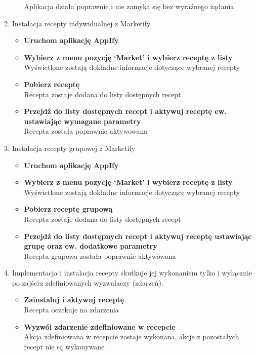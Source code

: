 \documentclass[11pt,a4paper,polish,thesis]{dcsbook}
\begin{document}
\begin{enumerate}
\begin{itemize}
Aplikacja działa poprawnie i nie zamyka się bez wyraźnego żądania
\end{itemize}
\item
Instalacja recepty indywidualnej z Marketify
\begin{itemize}
\item \textbf{Uruchom aplikację AppIfy}\\
\item \textbf{Wybierz z menu pozycję ‘Market’ i wybierz receptę z listy}\\
Wyświetlone zostają dokładne informacje dotyczące wybranej recepty
\item \textbf{Pobierz receptę}\\
Recepta zostaje dodana do listy dostępnych recept
\item \textbf{Przejdź do listy dostępnych recept i aktywuj receptę ew. ustawiając wymagane parametry}\\
Recepta została poprawnie aktywowana
\end{itemize}
\item
Instalacja recepty grupowej z Marketify
\begin{itemize}
\item \textbf{Uruchom aplikację AppIfy}\\
\item \textbf{Wybierz z menu pozycję ‘Market’ i wybierz receptę z listy}\\
Wyświetlone zostają dokładne informacje dotyczące wybranej recepty
\item \textbf{Pobierz receptę grupową}\\
Recepta zostaje dodana do listy dostępnych recept
\item \textbf{Przejdź do listy dostępnych recept i aktywuj receptę ustawiając grupę oraz ew. dodatkowe parametry}\\
Recepta grupowa została poprawnie aktywowana
\end{itemize}
\item
Implementacja i instalacja recepty skutkuje jej wykonaniem tylko i wyłącznie po zajściu zdefiniowanych wyzwalaczy (zdarzeń).
\begin{itemize}
\item \textbf{Zainstaluj i aktywuj receptę}\\
Recepta oczekuje na zdarzenia
\item \textbf{Wyzwól zdarzenie zdefiniowane w recepcie}\\
Akcja zdefiniowana w recepcie zostaje wykonana, akcje z pozostałych recept nie są wykonywane

\end{itemize}
\end{enumerate}
\end{document}

